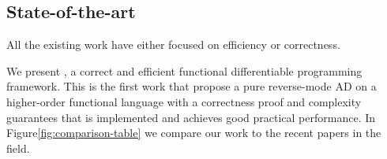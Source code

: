 \subsection{State-of-the-art} %
\label{sub:state_of_the_art}

All the existing work have either focused on efficiency or correctness.

We present \system{}, a correct and efficient functional differentiable programming framework. This is the first work that propose a pure reverse-mode AD on a higher-order functional language with a correctness proof and complexity guarantees that is implemented and achieves good practical performance. In Figure\ref{fig:comparison-table} we compare our work to the recent papers in the field. 


